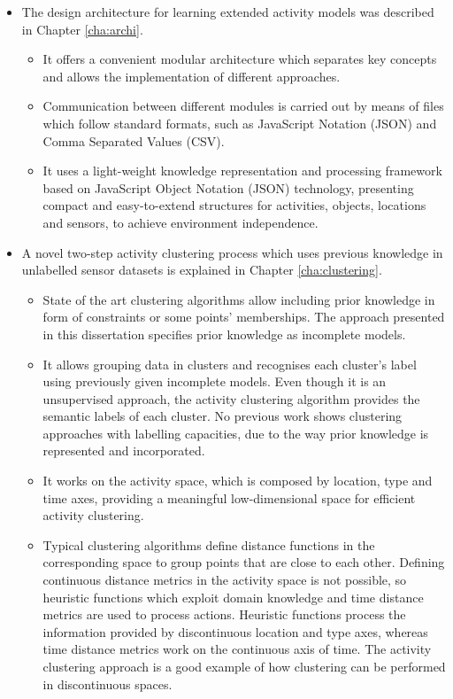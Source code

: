  \begin{itemize}
 \item The design architecture for learning extended activity models was described in Chapter \ref{cha:archi}.
 \begin{itemize}
  \item It offers a convenient modular architecture which separates key concepts and allows the implementation of different approaches.
  \item Communication between different modules is carried out by means of files which follow standard formats, such as JavaScript Notation (JSON) and Comma Separated Values (CSV). 
  \item It uses a light-weight knowledge representation and processing framework based on JavaScript Object Notation (JSON) technology, presenting compact and easy-to-extend structures for activities, objects, locations and sensors, to achieve environment independence.
 \end{itemize}

 \item A novel two-step activity clustering process which uses previous knowledge in unlabelled sensor datasets is explained in Chapter \ref{cha:clustering}. %
 \begin{itemize}
  \item State of the art clustering algorithms allow including prior knowledge in form of constraints or some points' memberships. The approach presented in this dissertation specifies prior knowledge as incomplete models.
  \item It allows grouping data in clusters and recognises each cluster's label using previously given incomplete models. Even though it is an unsupervised approach, the activity clustering algorithm provides the semantic labels of each cluster. No previous work shows clustering approaches with labelling capacities, due to the way prior knowledge is represented and incorporated.
  \item It works on the activity space, which is composed by location, type and time axes, providing a meaningful low-dimensional space for efficient activity clustering.
  \item Typical clustering algorithms define distance functions in the corresponding space to group points that are close to each other. Defining continuous distance metrics in the activity space is not possible, so heuristic functions which exploit domain knowledge and time distance metrics are used to process actions. Heuristic functions process the information provided by discontinuous location and type axes, whereas time distance metrics work on the continuous axis of time. The activity clustering approach is a good example of how clustering can be performed in discontinuous spaces.
 \end{itemize}


\end{itemize}
